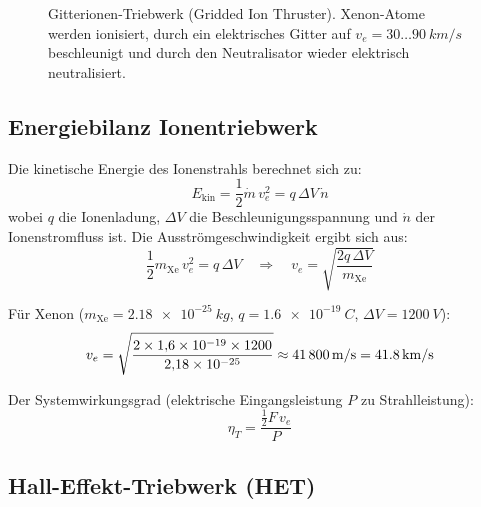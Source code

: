 ﻿\documentclass[12pt,a4paper]{article}
\newcommand{\mdot}{\dot{m}}
\begin{document}
\begin{figure}[H]
\caption{Gitterionen-Triebwerk (Gridded Ion Thruster). Xenon-Atome werden ionisiert,
durch ein elektrisches Gitter auf $v_e = 30\ldots\SI{90}{km/s}$ beschleunigt und
durch den Neutralisator wieder elektrisch neutralisiert.}
\label{fig:ionentriebwerk}
\end{figure}

\subsection{Energiebilanz Ionentriebwerk}

Die kinetische Energie des Ionenstrahls berechnet sich zu:
\[
  E_{\mathrm{kin}} = \frac{1}{2}\mdot\,v_e^2 = q\,\Delta V\,\dot{n}
\]
wobei $q$ die Ionenladung, $\Delta V$ die Beschleunigungsspannung und $\dot{n}$ der
Ionenstromfluss ist. Die Ausströmgeschwindigkeit ergibt sich aus:
\[
  \frac{1}{2}m_{\mathrm{Xe}}\,v_e^2 = q\,\Delta V
  \quad\Rightarrow\quad
  v_e = \sqrt{\frac{2q\,\Delta V}{m_{\mathrm{Xe}}}}
\]

Für Xenon ($m_{\mathrm{Xe}} = \SI{2.18e-25}{kg}$, $q = \SI{1.6e-19}{C}$,
$\Delta V = \SI{1200}{V}$):
\[
  v_e = \sqrt{\frac{2 \times 1{,}6\times10^{-19} \times 1200}{2{,}18\times10^{-25}}}
  \approx \SI{41\,800}{m/s} = \SI{41.8}{km/s}
\]

Der Systemwirkungsgrad (elektrische Eingangsleistung $P$ zu Strahlleistung):
\[
  \eta_T = \frac{\frac{1}{2}F\,v_e}{P}
\]

\subsection{Hall-Effekt-Triebwerk (HET)}
\end{document}
